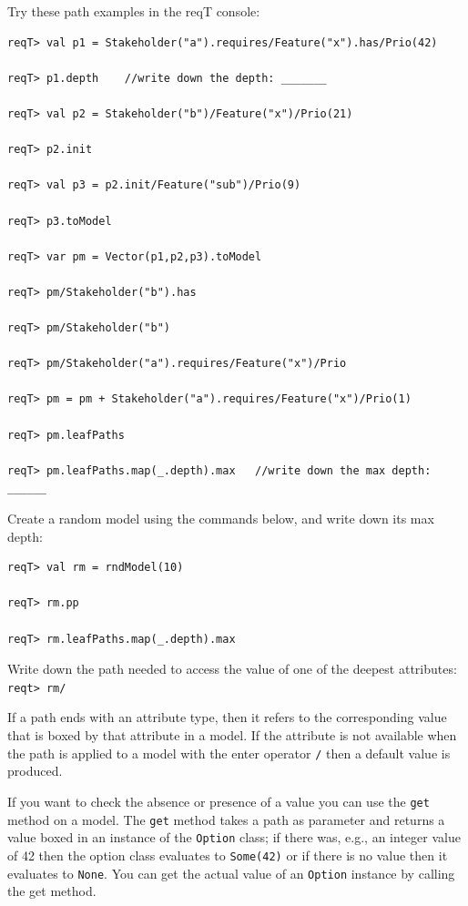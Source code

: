 \documentclass[11pt]{article}
\begin{document}
\begin{framed}\noindent
Try these path examples in the reqT console: 
{\scriptsize \begin{verbatim}
reqT> val p1 = Stakeholder("a").requires/Feature("x").has/Prio(42)

reqT> p1.depth    //write down the depth: _______

reqT> val p2 = Stakeholder("b")/Feature("x")/Prio(21)

reqT> p2.init

reqT> val p3 = p2.init/Feature("sub")/Prio(9)

reqT> p3.toModel

reqT> var pm = Vector(p1,p2,p3).toModel

reqT> pm/Stakeholder("b").has

reqT> pm/Stakeholder("b")

reqT> pm/Stakeholder("a").requires/Feature("x")/Prio

reqT> pm = pm + Stakeholder("a").requires/Feature("x")/Prio(1)

reqT> pm.leafPaths

reqT> pm.leafPaths.map(_.depth).max   //write down the max depth: ______
\end{verbatim}}
\end{framed}
\begin{framed}\noindent
Create a random model using the commands below, and write down its max depth: \underline{\hspace{1cm}}
{\scriptsize \begin{verbatim}
reqT> val rm = rndModel(10)
 
reqT> rm.pp

reqT> rm.leafPaths.map(_.depth).max 
\end{verbatim}}
\noindent Write down the path needed to access the value of one of the deepest attributes:\newline\newline
\verb+reqt> rm/+\underline{\hspace{9cm}}
\end{framed}
 
If a path ends with an attribute type, then it refers to the corresponding value that is boxed by that attribute in a model. If the attribute is not available when the path is applied to a model with the enter operator \verb+/+ then a default value is produced. 

If you want to check the absence or presence of a value you can use the \verb+get+ method on a model. The \verb+get+ method takes a path as parameter and returns a value boxed in an instance of the \verb+Option+ class; if there was, e.g.,  an integer value of 42 then the option class evaluates to \verb+Some(42)+ or if there is no value then it evaluates to \verb+None+. You can get the actual value of an \verb+Option+ instance by calling the get method.    
\end{document}
